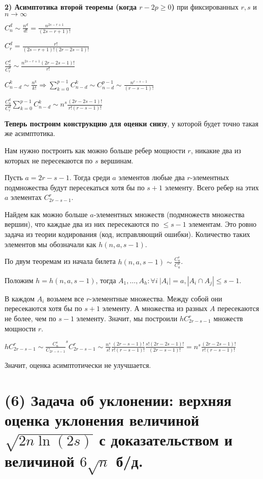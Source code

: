 \textbf{2) Асимптотика второй теоремы (когда $r - 2p \geq 0$)} при фиксированных $r, s$ и  $n \to \infty$

$C_n^d \sim \frac{n^d}{d!} = \frac{n^{2s-r+1}}{(2s-r+1)!}$

$C_r^d = \frac{r!}{(2s-r+1)!(2r-2s-1)!}$

$\frac{C_n^d}{C_r^d} \sim \frac{n^{2s-r+1}(2r-2s-1)!}{r!}$

$C_{n-d}^k \sim \frac{n^k}{k!} \Rightarrow \sum\limits_{k=0}^{p-1}C_{n-d}^k \sim C_{n-d}^{p-1} \sim \frac{n^{r-s-1}}{(r-s-1)!}$

$\frac{C_n^d}{C_r^d}\sum\limits_{k=0}^{p-1}C_{n-d}^k \sim n^s\frac{(2r-2s-1)!}{r!(r-s-1)!}$

\textbf{Теперь построим конструкцию для оценки снизу}, у которой будет точно такая же асимптотика.

Нам нужно построить как можно больше ребер мощности $r$, никакие два из которых не пересекаются по $s$ вершинам.

Пусть $a = 2r-s-1$. Тогда среди $a$ элементов любые два $r$-элементных подмножества будут пересекаться хотя бы по $s+1$ элементу. Всего ребер на этих $a$ элементах $C_{2r-s-1}^r$.

Найдем как можно больше $a$-элементных множеств (подмножеств множества вершин), что каждые два из них пересекаются по $\le s-1$ элементам. Это ровно задача из теории кодирования (код, исправляющий ошибки). Количество таких элементов мы обозначали как $h(n, a, s-1)$.

По двум теоремам из начала билета $h(n, a, s-1) \sim \frac{C_n^s}{C_a^s}$.

Положим $h = h(n, a, s-1)$, тогда $A_1, \ldots, A_h : \forall i \ |A_i| = a, |A_i\cap A_j| \leq s-1$.

В каждом $A_i$ возьмем все $r$-элементные множества. Между собой они пересекаются хотя бы по $s+1$ элементу. А множества из разных $A$ пересекаются не более, чем по $s-1$ элементу. Значит, мы построили $hC_{2r-s-1}^r$ множеств мощности $r$.

$hC_{2r-s-1}^r \sim \frac{C_n^s}{C_{2r-s-1}}^sC_{2r-s-1}^r \sim
\frac{n^s}{s!}\frac{(2r-s-1)!}{r!(r-s-1)!}\frac{s!(2r-2s-1)!}{(2r-s-1)!} = n^s\frac{(2r-2s-1)!}{r!(r-s-1)!}$

Значит, оценка асимптотически не улучшается.
\newpage{}

\section{(6) Задача об уклонении: верхняя оценка уклонения величиной 
$\sqrt{2n \ln (2s)}$ с доказательством и величиной $6 \sqrt{n}$ б/д.}

\newpage{}


